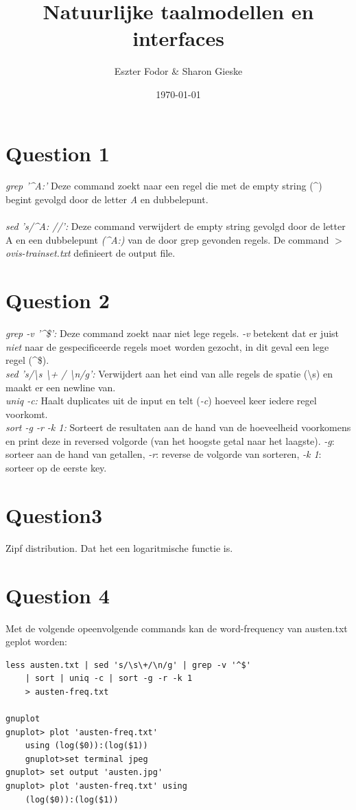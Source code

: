 \documentclass[a4paper,11pt]{article}
\begin{document}
\title{Natuurlijke taalmodellen en interfaces}
\author{Eszter Fodor \& Sharon Gieske}
\date{\today}
\maketitle

\section*{Question 1}
\textit{grep '\^{}A:'} Deze command zoekt naar een regel die met de empty string (\^{}) begint gevolgd door de letter \textit{A} en dubbelepunt.\\\\
\textit{sed 's/\^{}A: //':} Deze command verwijdert de empty string gevolgd door de letter A en een dubbelepunt \textit{(\^{}A:)} van de door grep gevonden regels. De command \textit{$>$ ovis-trainset.txt} definieert de output file.

\section*{Question 2}
\textit{grep -v '\^{}\$':} Deze command zoekt naar niet lege regels. \textit{-v} betekent dat er juist \textit{niet} naar de gespecificeerde regels moet worden gezocht, in dit geval een lege regel (\^{}\$).\\
\textit{sed 's/\textbackslash s \textbackslash + / \textbackslash n/g':} Verwijdert aan het eind van alle regels de spatie (\textbackslash s) en maakt er een newline van. \\
\textit{uniq -c:} Haalt duplicates uit de input en telt (\textit{-c}) hoeveel keer iedere regel voorkomt. \\
\textit{sort -g -r -k 1:} Sorteert de resultaten aan de hand van de hoeveelheid voorkomens en print deze in reversed volgorde (van het hoogste getal naar het laagste). \textit{-g}: sorteer aan de hand van getallen, \textit{-r}: reverse de volgorde van sorteren, \textit{-k 1}: sorteer op de eerste key.\\

\section*{Question3}
Zipf distribution. Dat het een logaritmische functie is.

\newpage

\section*{Question 4}
Met de volgende opeenvolgende commands kan de word-frequency van austen.txt geplot worden: 
\begin{lstlisting}[frame=single]
less austen.txt | sed 's/\s\+/\n/g' | grep -v '^$' 
	| sort | uniq -c | sort -g -r -k 1 
	> austen-freq.txt
	
gnuplot
gnuplot> plot 'austen-freq.txt' 
	using (log($0)):(log($1))
	gnuplot>set terminal jpeg
gnuplot> set output 'austen.jpg'
gnuplot> plot 'austen-freq.txt' using 
	(log($0)):(log($1))
\end{lstlisting}
\end{document}
